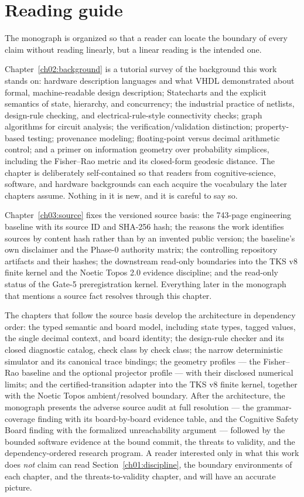 \section{Reading guide}\label{ch01:guide}

The monograph is organized so that a reader can locate the boundary of every
claim without reading linearly, but a linear reading is the intended one.

Chapter~\ref{ch02:background} is a tutorial survey of the background this
work stands on: hardware description languages and what VHDL demonstrated
about formal, machine-readable design description; Statecharts and the
explicit semantics of state, hierarchy, and concurrency; the industrial
practice of netlists, design-rule checking, and electrical-rule-style
connectivity checks; graph algorithms for circuit analysis; the
verification/validation distinction; property-based testing; provenance
modeling; floating-point versus decimal arithmetic control; and a primer on
information geometry over probability simplices, including the Fisher--Rao
metric and its closed-form geodesic distance. The chapter is deliberately
self-contained so that readers from cognitive-science, software, and
hardware backgrounds can each acquire the vocabulary the later chapters
assume. Nothing in it is new, and it is careful to say so.

Chapter~\ref{ch03:source} fixes the versioned source basis: the 743-page
engineering baseline with its source ID and SHA-256 hash; the reasons the
work identifies sources by content hash rather than by an invented public
version; the baseline's own disclaimer and the Phase-0 authority matrix;
the controlling repository artifacts and their hashes; the downstream
read-only boundaries into the TKS v8 finite kernel and the Noetic Topos 2.0
evidence discipline; and the read-only status of the Gate-5 preregistration
kernel. Everything later in the monograph that mentions a source fact
resolves through this chapter.

The chapters that follow the source basis develop the architecture in
dependency order: the typed semantic and board model, including state
types, tagged values, the single decimal context, and board identity; the
design-rule checker and its closed diagnostic catalog, check class by check
class; the narrow deterministic simulator and its canonical trace bindings;
the geometry profiles --- the Fisher--Rao baseline and the optional
projector profile --- with their disclosed numerical limits; and the
certified-transition adapter into the TKS v8 finite kernel, together with
the Noetic Topos ambient/resolved boundary. After the architecture, the
monograph presents the adverse source audit at full resolution --- the
grammar-coverage finding with its board-by-board evidence table, and the
Cognitive Safety Board finding with the formalized unreachability argument
--- followed by the bounded software evidence at the bound commit, the
threats to validity, and the dependency-ordered research program. A reader
interested only in what this work does \emph{not} claim can read
Section~\ref{ch01:discipline}, the boundary environments of each chapter,
and the threats-to-validity chapter, and will have an accurate picture.

